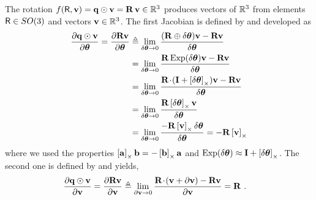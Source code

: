 The rotation $f(\sR,\bfv) = \bfq\od\bfv = \bfR\,\bfv \in \bbR^3$ produces vectors of $\bbR^3$ from elements $\sR\in SO(3)$ and vectors $\bfv\in\bbR^3$. The first Jacobian is defined by  and developed as
%
\begin{align*}
\dpar{\bfq\od\bfv}{\bth} = \dpar{\bfR\bfv}{\bth} 
&\te \lim_{\delta\bth\to0}\frac{(\bfR\oplus\delta\bth)\bfv-\bfR\bfv}{\delta\bth} \\
&= \lim_{\delta\bth\to0}\frac{\bfR\Exp(\delta\bth)\bfv-\bfR\bfv}{\delta\bth} \\
&= \lim_{\delta\bth\to0}\frac{\bfR\tdot(\bfI+\hatx{\delta\bth})\bfv-\bfR\bfv}{\delta\bth} \\
&= \lim_{\delta\bth\to0}\frac{\bfR\hatx{\delta\bth}\bfv}{\delta\bth} \\
&= \lim_{\delta\bth\to0}\frac{-\bfR\hatx{\bfv}\delta\bth}{\delta\bth} 
= -\bfR\hatx{\bfv} 
\end{align*}
%
where we used the properties $\hatx{\bfa}\bfb = -\hatx{\bfb}\bfa$ and $\Exp(\dth) \approx \bfI + \hatx{\dth}$. 
The second one is defined by  and yields,
%
\begin{align*}
\dpar{\bfq\od\bfv}{\bfv} = \dpar{\bfR\bfv}{\bfv} 
&\te \lim_{\partial\bfv\to0}\frac{\bfR\tdot(\bfv+\partial\bfv)-\bfR\bfv}{\partial\bfv} 
= \bfR
~.
\end{align*}





